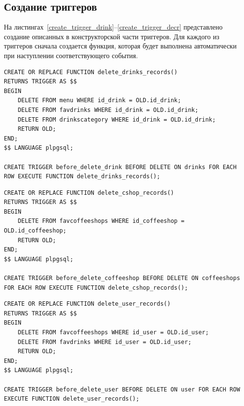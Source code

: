 \subsection{Создание триггеров}
На листингах~\ref{create_trigger_drink}--\ref{create_trigger_decr} представлено создание описанных в конструкторской части триггеров. Для каждого из триггеров сначала создается функция, которая будет выполнена автоматически при наступлении соответствующего события.
\begin{center}
	\captionsetup{justification=raggedright,singlelinecheck=off}
	\begin{lstlisting}[label=create_trigger_drink,caption={Создание триггера, удаляещего из таблиц menu, favdrinks и drinkscategory все записи, связанные с удаляемым из таблицы drinks напитком}]
CREATE OR REPLACE FUNCTION delete_drinks_records()
RETURNS TRIGGER AS $$
BEGIN
	DELETE FROM menu WHERE id_drink = OLD.id_drink;
	DELETE FROM favdrinks WHERE id_drink = OLD.id_drink;
	DELETE FROM drinkscategory WHERE id_drink = OLD.id_drink;
	RETURN OLD;
END;
$$ LANGUAGE plpgsql;

CREATE TRIGGER before_delete_drink BEFORE DELETE ON drinks FOR EACH ROW EXECUTE FUNCTION delete_drinks_records();
	\end{lstlisting}
\end{center}

\begin{center}
	\captionsetup{justification=raggedright,singlelinecheck=off}
	\begin{lstlisting}[label=create_trigger_cshop,caption={Создание триггера, удаляещего из таблицы favcoffeeshops все записи, связанные с удаляемой из таблицы coffeeshops кофейней}]
CREATE OR REPLACE FUNCTION delete_cshop_records()
RETURNS TRIGGER AS $$
BEGIN
	DELETE FROM favcoffeeshops WHERE id_coffeeshop = OLD.id_coffeeshop;
	RETURN OLD;
END;
$$ LANGUAGE plpgsql;

CREATE TRIGGER before_delete_coffeeshop BEFORE DELETE ON coffeeshops FOR EACH ROW EXECUTE FUNCTION delete_cshop_records();
	\end{lstlisting}
\end{center}

\begin{center}
	\captionsetup{justification=raggedright,singlelinecheck=off}
	\begin{lstlisting}[label=create_trigger_user,caption={Создание триггера, удаляещего из таблиц favcoffeeshops и favdrinks все записи, связанные с удаляемым из таблицы users пользователем}]
CREATE OR REPLACE FUNCTION delete_user_records()
RETURNS TRIGGER AS $$
BEGIN
	DELETE FROM favcoffeeshops WHERE id_user = OLD.id_user;
	DELETE FROM favdrinks WHERE id_user = OLD.id_user;
	RETURN OLD;
END;
$$ LANGUAGE plpgsql;

CREATE TRIGGER before_delete_user BEFORE DELETE ON user FOR EACH ROW EXECUTE FUNCTION delete_user_records();
	\end{lstlisting}
\end{center}

